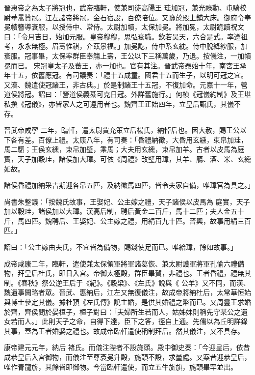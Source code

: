 \begin{pinyinscope}
 晉惠帝之為太子將冠也，武帝臨軒，使兼司徒高陽王
 珪加冠，兼光祿勳、屯騎校尉華暠贊冠。江左諸帝將冠，金石宿設，百僚陪位。又豫於殿上鋪大床。御府令奉冕幘簪導袞服，以授侍中、常侍。太尉加幘，太保加冕。將加冕，太尉跪讀祝文曰：「令月吉日，始加元服。皇帝穆穆，思弘袞職。欽若昊天，六合是式。率遵祖考，永永無極。眉壽惟祺，介茲景福。」加冕訖，侍中系玄紞。侍中脫絳紗服，加袞服。冠事畢，太保率群臣奉觴上壽，王公以下三稱萬歲，乃退。按儀注，一加幘冕而已。
 宋冠皇太子及蕃王，亦一加也。官有其注。晉武帝泰始十年，南宮王承年十五，依舊應冠。有司議奏：「禮十五成童。國君十五而生子，以明可冠之宜。又漢、魏遣使冠諸王，非古典。」於是制諸王十五冠，不復加命。元嘉十一年，營道侯將冠。詔曰：「營道侯義綦可克日冠。外詳舊施行。」何楨《冠儀約制》及王堪私撰《冠儀》，亦皆家人之可遵用者也。魏齊王正始四年，立皇后甄氏，其儀不存。



 晉武帝咸寧
 二年，臨軒，遣太尉賈充策立后楊氏，納悼后也。因大赦，賜王公以下各有差。百僚上禮。太康八年，有司奏：「昏禮納徵，大昏用玄纁，束帛加珪，馬二駟；王侯玄纁，束帛加璧，乘馬；大夫用玄纁，束帛加羊。古者以皮馬為庭實，天子加穀珪，諸侯加大璋。可依《周禮》改璧用璋，其羊、鴈、酒、米、玄纁如故。



 諸侯昏禮加納采吉期迎各帛五匹，及納徵馬四匹，皆令夫家自備，唯璋官為具之。」



 尚書朱整議：「按魏氏故事，王娶妃、公主嫁之禮，天子諸侯以皮馬為
 庭實，天子加以穀珪，諸侯加以大璋。漢高后制，聘后黃金二百斤，馬十二匹；夫人金五十斤，馬四匹。魏聘后、王娶妃、公主嫁之禮，用絹百九十匹。晉興，故事用絹三百匹。」



 詔曰：「公主嫁由夫氏，不宜皆為備物，賜錢使足而已。唯給璋，餘如故事。」



 成帝咸康二年，臨軒，遣使兼太保領軍將軍諸葛恢、兼太尉護軍將軍孔愉六禮備物，拜皇后杜氏，即日入宮。帝御太極殿，群臣畢賀，非禮也。王者昏禮，禮無其制。《春秋》祭公逆王后于《紀》。《穀梁》、《左氏》說與《
 公羊》又不同，而漢、魏遺事闕略者眾。晉武、惠納后，江左又無復儀注，故成帝將納杜后，太常華恒始與博士參定其儀。據杜預《左氏傳》說主婚，是供其婚禮之幣而已。又周靈王求婚於齊，齊侯問於晏桓子，桓子對曰：「夫婦所生若而人，姑姊妹則稱先守某公之遺女若而人。」此則天子之命，自得下達，臣下之答，徑自上通。先儒以為丘明詳錄其事，蓋為王者婚娶之禮也。故成帝臨軒遣使稱制拜后。然其儀注，又不具存。



 康帝建元元年，納后
 褚氏。而儀注陛者不設旄頭。殿中御史奏：「今迎皇后，依昔成恭皇后入宮御物，而儀注至尊袞冕升殿，旄頭不設，求量處。又案昔迎恭皇后，唯作青龍旂，其餘皆即御物。今當臨軒遣使，而立五牛旂旗，旄頭畢罕並出。




\end{pinyinscope}
